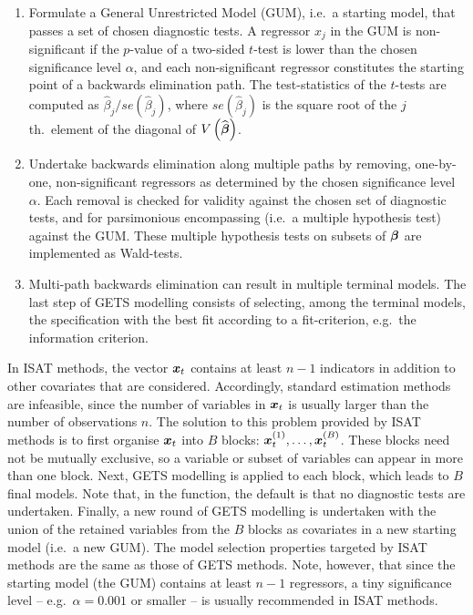 \begin{enumerate}
	\item Formulate a General Unrestricted Model (GUM), i.e.\ a starting model, that passes a set of chosen diagnostic tests. A regressor $x_j$ in the GUM is non-significant if the $p$-value of a two-sided $t$-test is lower than the chosen significance level $\alpha$, and each non-significant regressor constitutes the starting point of a backwards elimination path. The test-statistics of the $t$-tests are computed as $\widehat{\beta}_j/se\left(\widehat{\beta}_j\right)$, where $se\left(\widehat{\beta}_j\right)$ is the square root of the $j$th.\ element of the diagonal of $V\left(\widehat{\boldsymbol{\beta}}\right)$.
	
	\item Undertake backwards elimination along multiple paths by removing, one-by-one, non-significant regressors as determined by the chosen significance level $\alpha$. Each removal is checked for validity against the chosen set of diagnostic tests, and for parsimonious encompassing (i.e.\ a multiple hypothesis test) against the GUM. These multiple hypothesis tests on subsets of $\boldsymbol{\beta}$ are implemented as Wald-tests.
	
	\item Multi-path backwards elimination can result in multiple terminal models. The last step of GETS modelling consists of selecting, among the terminal models, the specification with the best fit according to a fit-criterion, e.g.\ the \cite{Schwarz1978} information criterion. 
\end{enumerate}

In ISAT methods, the vector $\boldsymbol{x}_t$ contains at least $n-1$ indicators in addition to other covariates that are considered. Accordingly, standard estimation methods are infeasible, since the number of variables in $\boldsymbol{x}_t$ is usually larger than the number of observations $n$. The solution to this problem provided by ISAT methods is to first organise $\boldsymbol{x}_t$ into $B$ blocks: $\boldsymbol{x}_t^{\left(1\right)}, \ldots, \boldsymbol{x}_t^{\left(B\right)}$. These blocks need not be mutually exclusive, so a variable or subset of variables can appear in more than one block. Next, GETS modelling is applied to each block, which leads to $B$ final models. Note that, in the  function, the default is that no diagnostic tests are undertaken. Finally, a new round of GETS modelling is undertaken with the union of the retained variables from the $B$ blocks as covariates in a new starting model (i.e.\ a new GUM). The model selection properties targeted by ISAT methods are the same as those of GETS methods. Note, however, that since the starting model (the GUM) contains at least $n-1$ regressors, a tiny significance level -- e.g.\ $\alpha=0.001$ or smaller -- is usually recommended in ISAT methods.

